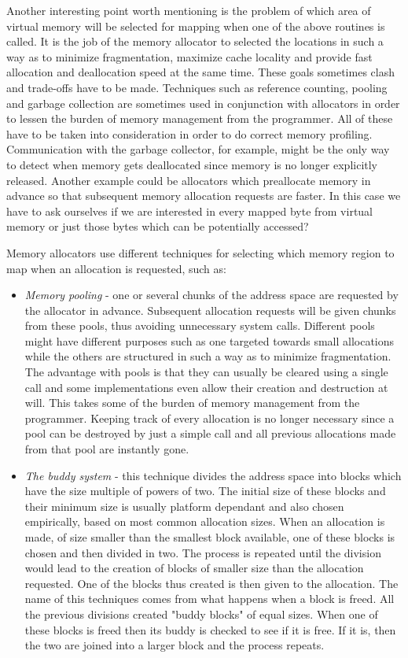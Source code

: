 Another interesting point worth mentioning is the problem of which area of virtual memory will be selected for mapping when one of the above routines is called. It is the job of the memory allocator to selected the locations in such a way as to minimize fragmentation, maximize cache locality and provide fast allocation and deallocation speed at the same time\cite{Wilson95}. These goals sometimes clash and trade-offs have to be made. Techniques such as reference counting, pooling and garbage collection are sometimes used in conjunction with allocators in order to lessen the burden of memory management from the programmer\cite{Detlefs94}. All of these have to be taken into consideration in order to do correct memory profiling. Communication with the garbage collector, for example, might be the only way to detect when memory gets deallocated since memory is no longer explicitly released. Another example could be allocators which preallocate memory in advance so that subsequent memory allocation requests are faster. In this case we have to ask ourselves if we are interested in every mapped byte from virtual memory or just those bytes which can be potentially accessed?

Memory allocators use different techniques for selecting which memory region to map when an allocation is requested, such as:
\begin{itemize}
\item \textit{Memory pooling} - one or several chunks of the address space are requested by the allocator in advance. Subsequent allocation requests will be given chunks from these pools, thus avoiding unnecessary system calls. Different pools might have different purposes such as one targeted towards small allocations while the others are structured in such a way as to minimize fragmentation. The advantage with pools is that they can usually be cleared using a single call and some implementations even allow their creation and destruction at will. This takes some of the burden of memory management from the programmer. Keeping track of every allocation is no longer necessary since a pool can be destroyed by just a simple call and all previous allocations made from that pool are instantly gone.
\item \textit{The buddy system} - this technique divides the address space into blocks which have the size multiple of powers of two. The initial size of these blocks and their minimum size is usually platform dependant and also chosen empirically, based on most common allocation sizes. When an allocation is made, of size smaller than the smallest block available, one of these blocks is chosen and then divided in two. The process is repeated until the division would lead to the creation of blocks of smaller size than the allocation requested. One of the blocks thus created is then given to the allocation. The name of this techniques comes from what happens when a block is freed. All the previous divisions created "buddy blocks" of equal sizes. When one of these blocks is freed then its buddy is checked to see if it is free. If it is, then the two are joined into a larger block and the process repeats.
\end{itemize}

